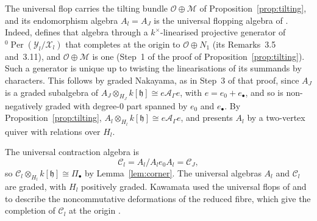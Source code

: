 \documentclass[11pt]{amsart}
\numberwithin{table}{section}
\numberwithin{figure}{section}
\numberwithin{equation}{section}
\theoremstyle{definition}
\theoremstyle{plain}
\newcommand{\cC}{\mathcal{C}}
\newcommand{\cA}{\mathcal{A}}
\newcommand{\cO}{\mathcal{O}}
\newcommand{\cX}{\mathcal{X}}
\newcommand{\cY}{\mathcal{Y}}
\newcommand{\h}{\mathfrak{h}}
\newcommand{\bul}{\bullet}
\DeclareMathOperator{\Per}{Per}
\begin{document}
The universal flop carries the tilting bundle $\cO \oplus \mathcal M$ of Proposition~\ref{prop:tilting}, and its endomorphism algebra $A_l = A_J$ is the universal flopping algebra of \cite[\S\S3.3, 4.4]{K}. Indeed, \cite{K} defines that algebra through a $k^\times$-linearised projective generator of ${}^0\Per(\cY_l/\cX_l)$ that completes at the origin to $\cO \oplus N_1$ (its Remarks~3.5 and~3.11), and $\cO \oplus \mathcal M$ is one (Step~1 of the proof of Proposition~\ref{prop:tilting}). Such a generator is unique up to twisting the linearisations of its summands by characters. This follows by graded Nakayama, as in Step~3 of that proof, since $A_J$ is a graded subalgebra of $A_J \otimes_{H_J} k[\h] \cong e\cA_\Gamma e$, with $e = e_0 + e_\bul$, and so is non-negatively graded with degree-$0$ part spanned by $e_0$ and $e_\bul$. By Proposition~\ref{prop:tilting}, $A_l \otimes_{H_l} k[\h] \cong e\cA_\Gamma e$, and \cite[Thm~1.3]{K} presents $A_l$ by a two-vertex quiver with relations over $H_l$.

The universal contraction algebra is
\[
\cC_l = A_l / A_l e_0 A_l = \cC_J ,
\]
so $\cC_l \otimes_{H_l} k[\h] \cong \Pi_\bul$ by Lemma~\ref{lem:corner}. The universal algebras $A_l$ and $\cC_l$ are graded, with $H_l$ positively graded. Kawamata used the universal flops of \cite{CM} and \cite{K} to describe the noncommutative deformations of the reduced fibre, which give the completion of $\cC_l$ at the origin \cite[Thm~6.2]{Kaw}.
\end{document}
